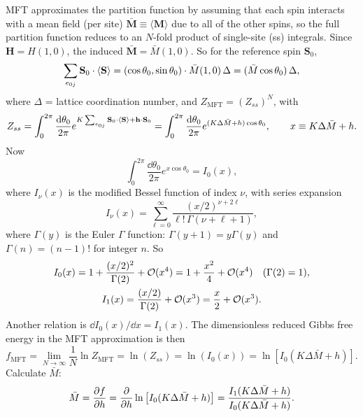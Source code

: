 MFT approximates the partition function by assuming that each spin interacts with a mean field (per
site) $\bar{\mathbf{M}}\equiv\langle\mathbf{M}\rangle$ due to all of the other spins, so the full
partition function reduces to an $N$-fold product of single-site (ss) integrals. Since
$\mathbf{H} = H(1,0)$, the induced $\bar{\mathbf{M}} = \bar M(1,0)$. So for the reference spin
$\mathbf{S}_0$,
\begin{equation}
  \sum_{e_{0j}}\mathbf{S}_0\cdot\langle \mathbf{S}\rangle = (\cos\theta_0,\sin\theta_0)\cdot\bar M(1,0)\,\Delta
  = (\bar M\cos\theta_0)\,\Delta,
\end{equation}
where $\Delta$ = lattice coordination number, and $Z_{\text{MFT}} = (Z_{ss})^N$, with
\begin{equation}
  Z_{ss} = \int_0^{2\pi}\frac{\mathop{}\!\mathrm{d}\theta_0}{2\pi}e^{K\sum_{e_{0j}}\mathbf{S}_0\cdot\langle \mathbf{S}\rangle + \mathbf{h}\cdot\mathbf{S}_0}
  = \int_0^{2\pi}\frac{\mathop{}\!\mathrm{d}\theta_0}{2\pi}e^{(K\Delta\bar M+h)\cos\theta_0},
  \qquad x\equiv K\Delta\bar M + h .
\end{equation}
Now
\begin{equation}
  \int_0^{2\pi}\frac{\dd\theta_0}{2\pi}e^{x\cos\theta_0} = I_0(x),
\end{equation}
where $I_\nu(x)$ is the modified Bessel function of index $\nu$, with series expansion
\begin{equation}
  I_\nu(x) = \sum_{\ell=0}^\infty\frac{(x/2)^{\nu+2\ell}}{\ell!\,\Gamma(\nu+\ell+1)},
\end{equation}
where $\Gamma(y)$ is the Euler $\Gamma$ function: $\Gamma(y+1) = y\Gamma(y)$ and $\Gamma(n) = (n-1)!$
for integer $n$. So
\begin{gather}
  I_0(x) = 1 + \frac{(x/2)^2}{\Gamma(2)} + \mathcal{O}(x^4) = 1 + \frac{x^2}{4} + \mathcal{O}(x^4)
  \quad(\Gamma(2) = 1),\nonumber\\
  I_1(x) = \frac{(x/2)}{\Gamma(2)} + \mathcal{O}(x^3) = \frac{x}{2} + \mathcal{O}(x^3).
\end{gather}
Another relation is $\dd I_0(x)/\dd x = I_1(x)$. The dimensionless reduced Gibbs free energy in
the MFT approximation is then
\begin{equation}
  f_{\text{MFT}} = \lim_{N\to\infty}\frac{1}{N}\ln Z_{\text{MFT}} = \ln(Z_{ss}) = \ln(I_0(x)) = \ln\left[I_0(K\Delta\bar M+h)\right].
\end{equation}
Calculate $\bar M$:
\begin{equation}
  \bar M = \frac{\partial f}{\partial h} = \frac{\partial }{\partial h}\ln\left[I_0(K\Delta\bar M+h)\right] = \frac{I_1(K\Delta\bar M+h)}{I_0(K\Delta\bar M+h)}.
\end{equation}
